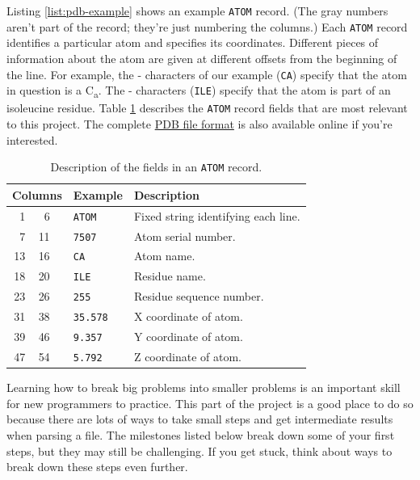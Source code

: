 \documentclass{article}
\newcommand{\calpha}{C\textsubscript{\textgreek{a}}}
\newcommand{\atomrec}{\texttt{ATOM} record}
\begin{document}
Listing \ref{list:pdb-example} shows an example \atomrec{}.  (The gray numbers 
aren't part of the record; they're just numbering the columns.)  Each 
\atomrec{} identifies a particular atom and specifies its coordinates.  
Different pieces of information about the atom are given at different offsets 
from the beginning of the line.  For example, the  -  
characters of our example (\texttt{CA}) specify that the atom in question is a 
\calpha{}.  The  -  characters (\texttt{ILE}) specify that the 
atom is part of an isoleucine residue.
Table \ref{tab:pdb-atom-record} describes the \atomrec{} fields that are most 
relevant to this project.  The complete 
\href{http://www.wwpdb.org/documentation/format33/v3.3.html}{PDB file format} 
is also available online if you're interested.

\begin{table}[h]
\centering
\begin{tabular}{r@{ - }rcll}
\toprule
\multicolumn{3}{l}{Columns} & Example         & Description                         \\
\midrule
 1 &  6 & & \texttt{ATOM}   & Fixed string identifying each line. \\
 7 & 11 & & \texttt{7507}   & Atom serial number.                 \\
13 & 16 & & \texttt{CA}     & Atom name.                          \\
18 & 20 & & \texttt{ILE}    & Residue name.                       \\
23 & 26 & & \texttt{255}    & Residue sequence number.            \\
31 & 38 & & \texttt{35.578} & X coordinate of atom.               \\
39 & 46 & & \texttt{9.357}  & Y coordinate of atom.               \\
47 & 54 & & \texttt{5.792}  & Z coordinate of atom.               \\
\bottomrule
\end{tabular}
\caption{Description of the fields in an \texttt{ATOM} record.}
\label{tab:pdb-atom-record}
\end{table}

Learning how to break big problems into smaller problems is an important skill 
for new programmers to practice.  This part of the project is a good place to 
do so because there are lots of ways to take small steps and get intermediate 
results when parsing a file.  The milestones listed below break down some of 
your first steps, but they may still be challenging.  If you get stuck, think 
about ways to break down these steps even further.
\end{document}
